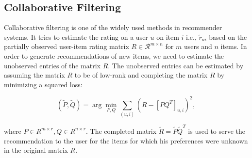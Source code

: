 
\subsection{Collaborative Filtering}

Collaborative filtering is one of the widely used methods in recommender
systems. It tries to estimate the rating on a user $u$ on item $i$ i.e.,
$\tilde{r}_{ui}$  based on the  partially observed user-item rating matrix $R
\in \mathcal{R}^{m \times n}$ for $m$ users and $n$ items. In order to generate
recommendations of new items, we need to estimate the unobserved entries of the
matrix $R$. The unobserved entries can be estimated by assuming the matrix $R$
to be of low-rank and completing the matrix $R$ by minimizing a squared loss:


\begin{equation}
  (\tilde{P}, \tilde{Q}) = \arg \min_{P,Q} \sum_{(u,i)} ( R - [PQ^T]_{u,i})^2,
\end{equation}

where $P \in R^{m \times r}, Q \in R^{n \times r}$. The completed matrix
$\tilde{R} = \tilde{P} \tilde{Q}^T$
is used to serve the recommendation to the user for the items for which his
preferences were unknown in the original matrix $R$.





